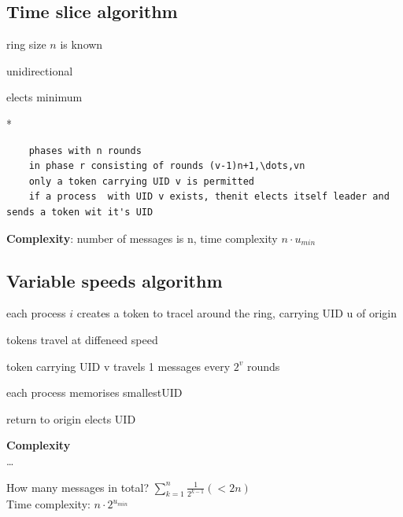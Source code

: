\subsection{Time slice algorithm}
\begin{compactitem}
\item ring size $n$ is known
\item unidirectional
\item elects minimum
\end{compactitem}*


\begin{lstlisting}
	phases with n rounds
	in phase r consisting of rounds (v-1)n+1,\dots,vn
	only a token carrying UID v is permitted
	if a process  with UID v exists, thenit elects itself leader and sends a token wit it's UID

\end{lstlisting}
\textbf{Complexity}: number of messages is n, time complexity $n\cdot u_{min}$

\subsection{Variable speeds algorithm}
\begin{compactitem}
\item each process $i$ creates a token to tracel around the ring, carrying UID u of origin
\item tokens travel at diffeneed speed
\item token carrying UID v travels  1 messages every $2^{v}$ rounds
\item each process memorises smallestUID
\item return to origin elects UID
\end{compactitem}

\textbf{Complexity}\\
\dots


How many messages in total? $\sum\limits_{k=1}^n \frac{1}{2^{k-1}} (<2n)$\\
Time complexity: $n\cdot 2^{u_{min}}$

